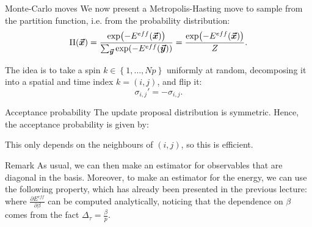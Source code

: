 \documentclass[a4paper]{article}
\begin{document}
\begin{parag}{Monte-Carlo moves}
    We now present a Metropolis-Hasting move to sample from the partition function, i.e. from the probability distribution: 
    \[\Pi\left(\bvec{x}\right) = \frac{\exp\left(-E^{eff}\left(\bvec{x}\right)\right)}{\sum_{\bvec{y}} \exp\left(-E^{eff}\left(\bvec{y}\right)\right)} = \frac{\exp\left(-E^{eff}\left(\bvec{x}\right)\right)}{Z}.\]
    
    The idea is to take a spin $k \in \left\{1, \ldots, Np\right\}$ uniformly at random, decomposing it into a spatial and time index $k = \left(i, j\right)$, and flip it:
    \[\sigma_{i, j}' = - \sigma_{i, j}.\]

    \begin{subparag}{Acceptance probability}
        The update proposal distribution is symmetric. Hence, the acceptance probability is given by:

        This only depends on the neighbours of $\left(i, j\right)$, so this is efficient.
    \end{subparag}
\end{parag}

\begin{parag}{Remark}
    As usual, we can then make an estimator for observables that are diagonal in the basis. Moreover, to make an estimator for the energy, we can use the following property, which has already been presented in the previous lecture:
    where $\frac{\partial E^{eff}}{\partial \beta} $ can be computed analytically, noticing that the dependence on $\beta$ comes from the fact $\Delta_{\tau} = \frac{\beta}{p}$.
\end{parag}
\end{document}
